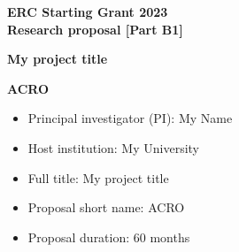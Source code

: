 \thispagestyle{fancy}
\begin{titlepage}

\begin{center}
   \large{\textbf{ERC Starting Grant 2023\\
   Research proposal [Part B1] }
   }
   \vspace{1cm}
   
   \LARGE{\textbf{My project title}}
   
   \vspace{1cm}
   
   \LARGE{\textbf{ACRO}}
   
   \vspace{1cm}
   
\normalsize   
\begin{itemize}
\item Principal investigator (PI): My Name
\item Host institution: My University
\item Full title: My project title
\item Proposal short name: ACRO
\item Proposal duration: 60 months
\end{itemize}
	
\noindent
{}

\vfill

\end{center}

\end{titlepage}

